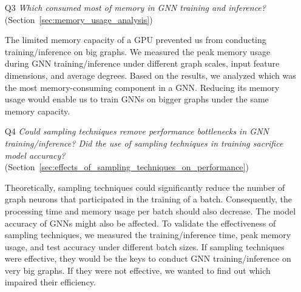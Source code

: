 \begin{itemize}
    \item[Q3] \emph{Which consumed most of memory in GNN training and inference?} (Section~\ref{sec:memory_usage_analysis})

          The limited memory capacity of a GPU prevented us from conducting training/inference on big graphs.
          We measured the peak memory usage during GNN training/inference under different graph scales, input feature dimensions, and average degrees.
          Based on the results, we analyzed which was the most memory-consuming component in a GNN.
          Reducing its memory usage would enable us to train GNNs on bigger graphs under the same memory capacity.

    \item[Q4] \emph{Could sampling techniques remove performance bottlenecks in GNN training/inference? Did the use of sampling techniques in training sacrifice model accuracy? } (Section~\ref{sec:effects_of_sampling_techniques_on_performance})

          Theoretically, sampling techniques could significantly reduce the number of graph neurons that participated in the training of a batch.
          Consequently, the processing time and memory usage per batch should also decrease.
          The model accuracy of GNNs might also be affected.
          To validate the effectiveness of sampling techniques, we measured the training/inference time, peak memory usage, and test accuracy under different batch sizes.
          If sampling techniques were effective, they would be the keys to conduct GNN training/inference on very big graphs.
          If they were not effective, we wanted to find out which impaired their efficiency.


\end{itemize}